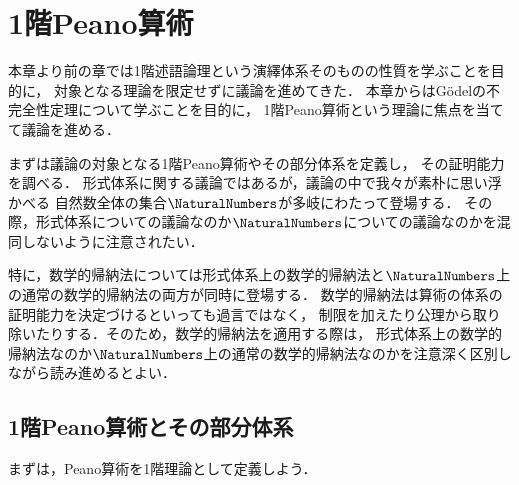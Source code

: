 \chapter{1階Peano算術}
\label{chap:peanoarithmetic}

本章より前の章では1階述語論理という演繹体系そのものの性質を学ぶことを目的に，
対象となる理論を限定せずに議論を進めてきた．
本章からはGödelの不完全性定理について学ぶことを目的に，
1階Peano算術という理論に焦点を当てて議論を進める．

まずは議論の対象となる1階Peano算術やその部分体系を定義し，
その証明能力を調べる．
形式体系に関する議論ではあるが，議論の中で我々が素朴に思い浮かべる
自然数全体の集合\(\NaturalNumbers\)が多岐にわたって登場する．
その際，形式体系についての議論なのか\(\NaturalNumbers\)についての議論なのかを混同しないように注意されたい．

特に，数学的帰納法については形式体系上の数学的帰納法と\(\NaturalNumbers\)上の通常の数学的帰納法の両方が同時に登場する．
数学的帰納法は算術の体系の証明能力を決定づけるといっても過言ではなく，
制限を加えたり公理から取り除いたりする．そのため，数学的帰納法を適用する際は，
形式体系上の数学的帰納法なのか\(\NaturalNumbers\)上の通常の数学的帰納法なのかを注意深く区別しながら読み進めるとよい．

\section{1階Peano算術とその部分体系}
\label{sec:peanoarithmetic}

まずは，Peano算術を1階理論として定義しよう．

